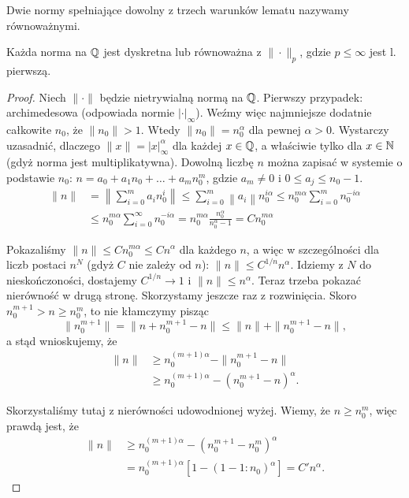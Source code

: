 \begin{definicja}
	Dwie normy spełniające dowolny z trzech warunków lematu nazywamy równoważnymi.
\end{definicja}

\begin{twierdzenie}[Ostrowski, 1916]
	Każda norma na $\mathbb Q$ jest dyskretna lub równoważna z $\|\cdot\|_p$, gdzie $p \le \infty$ jest l. pierwszą.
\end{twierdzenie}

\begin{proof}
	Niech $\|\cdot\|$ będzie nietrywialną normą na $\mathbb Q$.
	Pierwszy przypadek: archimedesowa (odpowiada normie $|\cdot|_\infty$).
	Weźmy więc najmniejsze dodatnie całkowite $n_0$, że $\|n_0\| > 1$.
	Wtedy $\|n_0\| = n_0^\alpha$ dla pewnej $\alpha > 0$.
	Wystarczy uzasadnić, dlaczego $\|x\| = |x|_\infty^\alpha$ dla każdej $x \in \mathbb Q$, a właściwie tylko dla $x \in \mathbb N $ (gdyż norma jest multiplikatywna).
	Dowolną liczbę $n$ można zapisać w systemie o podstawie $n_0$: $n = a_0 + a_1 n_0 + \dots + a_mn_0^m$, gdzie $a_m \neq 0$ i $0 \le a_j \le n_0-1$.
	\begin{align*}
		\|n\| & = \left\|\sum_{i=0}^m a_in_0^i\right\| \le \sum_{i=0}^m \left\|a_i\right\| n_0^{i \alpha} \le n_0^{m \alpha} \sum_{i = 0}^m n_0^{-i \alpha} \\ & \le n_0^{m \alpha} \sum_{i = 0}^\infty n_0^{-i \alpha} = n_0^{m \alpha} \frac{n_0^\alpha}{n_0^\alpha - 1} = C n_0^{m \alpha}
	\end{align*}

	Pokazaliśmy $\|n\| \le Cn_0^{m \alpha} \le C n^\alpha$ dla każdego $n$, a więc w szczególności dla liczb postaci $n^N$ (gdyż $C$ nie zależy od $n$): $\|n\| \le C^{1/n}n^\alpha$.
	Idziemy z $N$ do nieskończoności, dostajemy $C^{1/n} \to 1$ i $\|n\| \le n^\alpha$.
	Teraz trzeba pokazać nierówność w drugą stronę.
	Skorzystamy jeszcze raz z rozwinięcia.
	Skoro $n_0^{m+1} > n \ge n_0^m$, to nie kłamczymy pisząc
	\[
		\|n_0^{m+1}\| = \|n+n_0^{m+1} - n\| \le \|n\| + \|n_0^{m+1} - n\|,
	\]
	a stąd wnioskujemy, że 
	\begin{align*}
		\|n\| & \ge n_0^{(m+1) \alpha} - \|n_0^{m+1} - n\| \\
		& \ge n_0^{(m+1)\alpha} - (n_0^{m+1} - n)^\alpha.
	\end{align*}


	Skorzystaliśmy tutaj z nierówności udowodnionej wyżej.
	Wiemy, że $n \ge n_0^m$, więc prawdą jest, że
	\begin{align*}
		\|n\| & \ge n_0^{(m+1)\alpha} - (n_0^{m+1} - n_0^m)^\alpha \\
		& = n_0^{(m+1) \alpha} [1 - (1 - 1 : n_0)^\alpha] = C' n^\alpha.
	\end{align*}


\end{proof}
